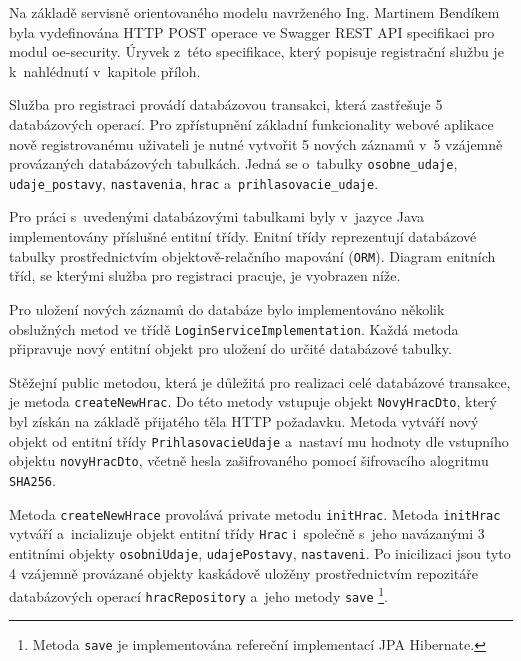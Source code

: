 \documentclass[twoside, 12pt]{article}
\begin{document}
{Na základě servisně orientovaného modelu navrženého Ing. Martinem Bendíkem
byla vydefinována HTTP POST operace ve Swagger REST API specifikaci pro modul oe-security.
Úryvek z~této specifikace, který popisuje registrační službu je k~nahlédnutí v~kapitole příloh.

Služba pro registraci provádí databázovou transakci,
která zastřešuje 5 databázových operací.
Pro zpřístupnění základní funkcionality webové aplikace nově registrovanému uživateli je nutné vytvořit 5 nových záznamů
v~5 vzájemně provázaných databázových tabulkách.
Jedná se o~tabulky \texttt{osobne\_udaje},
\texttt{udaje\_postavy}, \texttt{nastavenia}, \texttt{hrac} a~\texttt{prihlasovacie\_udaje}.

Pro práci s~uvedenými databázovými tabulkami byly v~jazyce Java implementovány příslušné entitní třídy.
Enitní třídy reprezentují databázové tabulky prostřednictvím
objektově-relačního mapování (\texttt{ORM}).
Diagram enitních tříd, se kterými služba pro registraci pracuje, je vyobrazen níže.

\obrazek
{}

\clearpage

Pro uložení nových záznamů do databáze bylo implementováno několik obslužných metod ve třídě \texttt{LoginServiceImplementation}.
Každá metoda připravuje nový entitní objekt pro uložení do určité databázové tabulky.

Stěžejní public metodou, která je důležitá pro realizaci celé databázové transakce, je metoda \texttt{createNewHrac}.
Do této metody vstupuje objekt \texttt{NovyHracDto}, který byl získán na základě přijatého těla HTTP požadavku.
Metoda vytváří nový objekt od entitní třídy \texttt{PrihlasovacieUdaje} a~nastaví mu hodnoty dle vstupního objektu \texttt{novyHracDto}, včetně hesla zašifrovaného pomocí šifrovacího alogritmu \texttt{SHA256}.

Metoda \texttt{createNewHrace} provolává private metodu \texttt{initHrac}.
Metoda \texttt{initHrac} vytváří a~incializuje objekt entitní třídy \texttt{Hrac}
i~společně s~jeho navázanými 3 entitními objekty
 \texttt{osobniUdaje},
\texttt{udajePostavy}, \texttt{nastaveni}.
Po inicilizaci jsou tyto 4 vzájemně provázané objekty kaskádově uložěny prostřednictvím
repozitáře databázových operací \texttt{hracRepository} a~jeho metody \texttt{save}
\footnote{Metoda \texttt{save} je implementována refereční implementací JPA Hibernate.}.

}
\end{document}

